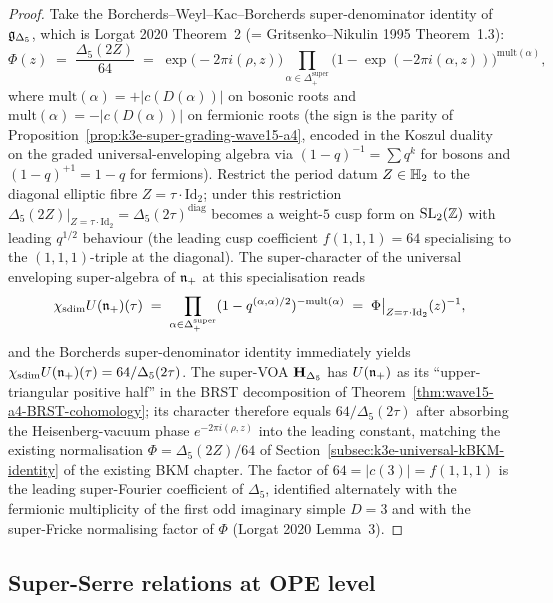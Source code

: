 \begin{proof}
Take the Borcherds--Weyl--Kac--Borcherds super-denominator
identity of $\mathfrak{g}_{\Delta_5}$, which is Lorgat 2020 Theorem~2
(= Gritsenko--Nikulin 1995 Theorem~1.3):
\[
  \Phi(z)
  \;=\;
  \frac{\Delta_5(2 Z)}{64}
  \;=\;
  \exp\bigl(-2\pi i (\rho, z)\bigr)
  \prod_{\alpha \in \Delta_+^{\mathrm{super}}}
  \bigl(1 - \exp(-2\pi i (\alpha, z))\bigr)^{\mathrm{mult}(\alpha)},
\]
where $\mathrm{mult}(\alpha) = +|c(D(\alpha))|$ on bosonic roots
and $\mathrm{mult}(\alpha) = -|c(D(\alpha))|$ on fermionic roots
(the sign is the parity of
Proposition~\ref{prop:k3e-super-grading-wave15-a4}, encoded in the
Koszul duality on the graded universal-enveloping algebra via
$(1 - q)^{-1} = \sum q^k$ for bosons and $(1 - q)^{+1} = 1 - q$ for
fermions). Restrict the period datum $Z \in \mathbb{H}_2$ to the
diagonal elliptic fibre $Z = \tau \cdot \mathrm{Id}_2$; under this
restriction $\Delta_5(2Z)\big|_{Z = \tau\cdot\mathrm{Id}_2} =
\Delta_5(2\tau)^{\mathrm{diag}}$ becomes a weight-$5$ cusp form
on $\mathrm{SL}_2(\mathbb{Z})$ with leading $q^{1/2}$ behaviour (the
leading cusp coefficient $f(1,1,1) = 64$ specialising to the
$(1, 1, 1)$-triple at the diagonal). The super-character of the
universal enveloping super-algebra of $\mathfrak{n}_+$ at this
specialisation reads
\[
  \chi_{\mathrm{sdim}} U(\mathfrak{n}_+)(\tau)
  \;=\;
  \prod_{\alpha \in \Delta_+^{\mathrm{super}}}
  (1 - q^{(\alpha, \alpha)/2})^{-\mathrm{mult}(\alpha)}
  \;=\;
  \Phi\big|_{Z = \tau \cdot \mathrm{Id}_2}(z)^{-1},
\]
and the Borcherds super-denominator identity immediately yields
$\chi_{\mathrm{sdim}} U(\mathfrak{n}_+)(\tau) = 64/\Delta_5(2\tau)$.
The super-VOA $\mathbf{H}_{\Delta_5}$ has $U(\mathfrak{n}_+)$ as its ``upper-triangular
positive half'' in the BRST decomposition of
Theorem~\ref{thm:wave15-a4-BRST-cohomology}; its character
therefore equals $64/\Delta_5(2\tau)$ after absorbing the
Heisenberg-vacuum phase $e^{-2\pi i(\rho, z)}$ into the leading
constant, matching the existing normalisation
$\Phi = \Delta_5(2Z)/64$ of
Section~\ref{subsec:k3e-universal-kBKM-identity} of the existing
BKM chapter. The factor of $64 = |c(3)| = f(1, 1, 1)$ is the
leading super-Fourier coefficient of $\Delta_5$, identified
alternately with the fermionic multiplicity of the first odd
imaginary simple $D = 3$ and with the super-Fricke normalising
factor of $\Phi$ (Lorgat 2020 Lemma~3).
\end{proof}

\subsection{Super-Serre relations at OPE level}
\label{wn:ssec:wave15-a4-super-serre}

